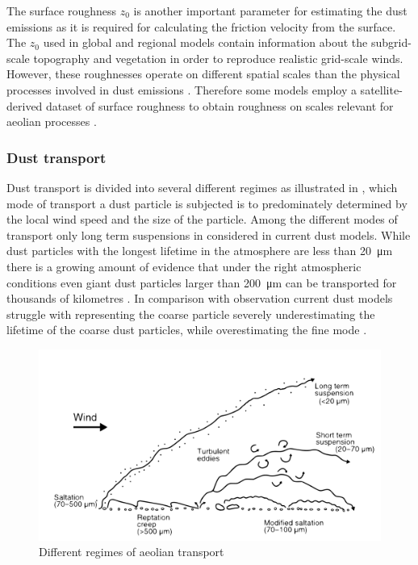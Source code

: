 The surface roughness $z_0$ is another important parameter for estimating the dust emissions as it is required for calculating the friction velocity from the surface. The $z_0$ used in global and regional models contain information about the subgrid-scale topography and vegetation in order to reproduce realistic grid-scale winds. However, these roughnesses operate on different spatial scales than the physical processes involved in dust emissions \parencite{darmenova_development_2009}. Therefore some models employ a satellite-derived dataset of surface roughness to obtain roughness on scales relevant for aeolian processes . 



\subsubsection{Dust transport}
Dust transport is divided into several different regimes as illustrated in , which mode of transport a dust particle is subjected is to predominately determined by the local wind speed and the size of the particle. Among the different modes of transport only long term suspensions in considered in current dust models. While dust particles with the longest lifetime in the atmosphere are less than \SI{20}{\micro\metre} there is a growing amount of evidence that under the right atmospheric conditions even giant dust particles larger than \SI{200}{\micro\metre} can be transported for thousands of kilometres \parencite{van2018mysterious}. In comparison with observation current dust models struggle with representing the coarse particle severely underestimating the lifetime of the coarse dust particles, while overestimating the fine mode \parencite{adebiyi2020dust}. 
\begin{figure}[htbp]
  \centering
  \includegraphics[draft=false,width = \textwidth]{texfiles/figs/aeolian_transport_Parsons_Abrahams.pdf}
  \caption{Different regimes of aeolian transport \parencite{nickling2009aeolian}}
  \label{fig:modes_of_dust_transport}
\end{figure}

